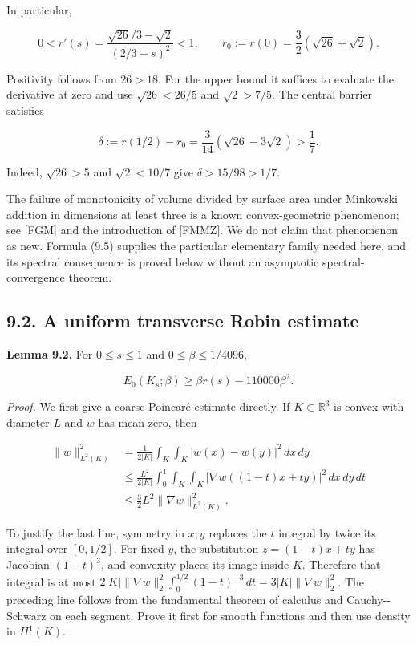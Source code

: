 \documentclass[11pt]{article}
\begin{document}
In particular,

\[
0<r'(s)=\frac{\sqrt{26}/3-\sqrt2}{(2/3+s)^2}<1,
\qquad r_0:=r(0)=\frac32(\sqrt{26}+\sqrt2).
\tag{9.6}
\]

Positivity follows from \(26>18\). For the upper bound it suffices to
evaluate the derivative at zero and use \(\sqrt{26}<26/5\) and
\(\sqrt2>7/5\). The central barrier satisfies

\[
\delta:=r(1/2)-r_0
=\frac3{14}(\sqrt{26}-3\sqrt2)>\frac17.
\tag{9.7}
\]

Indeed, \(\sqrt{26}>5\) and \(\sqrt2<10/7\) give \(\delta>15/98>1/7\).

The failure of monotonicity of volume divided by surface area under
Minkowski addition in dimensions at least three is a known
convex-geometric phenomenon; see {[}FGM{]} and the introduction of
{[}FMMZ{]}. We do not claim that phenomenon as new. Formula (9.5)
supplies the particular elementary family needed here, and its spectral
consequence is proved below without an asymptotic spectral-convergence
theorem.

\subsection{9.2. A uniform transverse Robin
estimate}\label{a-uniform-transverse-robin-estimate}

\textbf{Lemma 9.2.} For \(0\le s\le1\) and \(0\le\beta\le1/4096\),

\[
E_0(K_s;\beta)\ge\beta r(s)-110000\beta^2.
\tag{9.8}
\]

\emph{Proof.} We first give a coarse Poincaré estimate directly. If
\(K\subset\mathbb R^3\) is convex with diameter \(L\) and \(w\) has mean
zero, then

\[
\begin{aligned}
\|w\|_{L^2(K)}^2
&=\frac1{2|K|}\int_K\int_K|w(x)-w(y)|^2\,dx\,dy\\
&\le\frac{L^2}{2|K|}\int_0^1\int_K\int_K
 |\nabla w((1-t)x+ty)|^2\,dx\,dy\,dt\\
&\le\frac32L^2\|\nabla w\|_{L^2(K)}^2.
\end{aligned}
\tag{9.9}
\]

To justify the last line, symmetry in \(x,y\) replaces the \(t\)
integral by twice its integral over \([0,1/2]\). For fixed \(y\), the
substitution \(z=(1-t)x+ty\) has Jacobian \((1-t)^3\), and convexity
places its image inside \(K\). Therefore that integral is at most
\(2|K|\|\nabla w\|_2^2\int_0^{1/2}(1-t)^{-3}\,dt
=3|K|\|\nabla w\|_2^2\). The preceding line follows from the fundamental
theorem of calculus and Cauchy-\/-Schwarz on each segment. Prove it
first for smooth functions and then use density in \(H^1(K)\).
\end{document}
